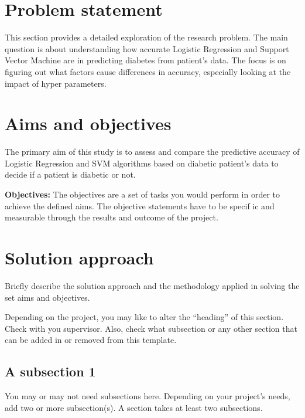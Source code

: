 \section{Problem statement}
\label{sec:intro_prob_art}
This section provides a detailed exploration of the research problem. The main question is about understanding how accurate Logistic Regression and Support Vector Machine are in predicting diabetes from patient's data. The focus is on figuring out what factors cause differences in accuracy, especially looking at the impact of hyper parameters.

\section{Aims and objectives}
\label{sec:intro_aims_obj}

The primary aim of this study is to assess and compare the predictive accuracy of Logistic Regression and SVM algorithms based on diabetic patient's data to decide if a patient is diabetic or not. 

\textbf{Objectives:} The objectives are a set of tasks you would perform in order to achieve the defined aims. The objective statements have to be specif ic and measurable through the results and outcome of the project.



\section{Solution approach}
\label{sec:intro_sol} %
Briefly describe the solution approach and the methodology applied in solving the set aims and objectives.

Depending on the project, you may like to alter the ``heading'' of this section. Check with you supervisor. Also, check what subsection or any other section that can be added in or removed from this template.

\subsection{A subsection 1}
\label{sec:intro_some_sub1}
You may or may not need subsections here. Depending on your project's needs, add two or more subsection(s). A section takes at least two subsections. 

